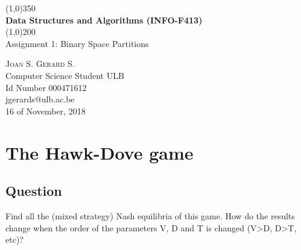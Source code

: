 \documentclass{article}
\begin{document}
\begin{titlepage}
	\begin{center}
		\line(1,0){350} \\
		\Huge{\bfseries Data Structures and Algorithms (INFO-F413)} \\
		\line(1,0){200} \\
		[1.5cm]
		\huge{Assignment 1: Binary Space Partitions} \\
		[10cm]
	\end{center}
	
	\begin{flushright}
	\textsc{\large Joan S. Gerard S.} \\
	Computer Science Student ULB\\
	Id Number 000471612 \\
	jgerards@ulb.ac.be\\
	16 of November, 2018 \\
	
	\end{flushright}
	
\end{titlepage}

\tableofcontents
\thispagestyle{empty}
\cleardoublepage

\listoffigures
\thispagestyle{empty}
\cleardoublepage

\setcounter{page}{1}
\section{The Hawk-Dove game}\label{sec:hack-dove}

\subsection{Question}
Find all the (mixed strategy) Nash equilibria of this game. How do the results change when the order of the parameters V, D and T is changed (V>D, D>T, etc)?


\cleardoublepage
\appendix
\end{document}
